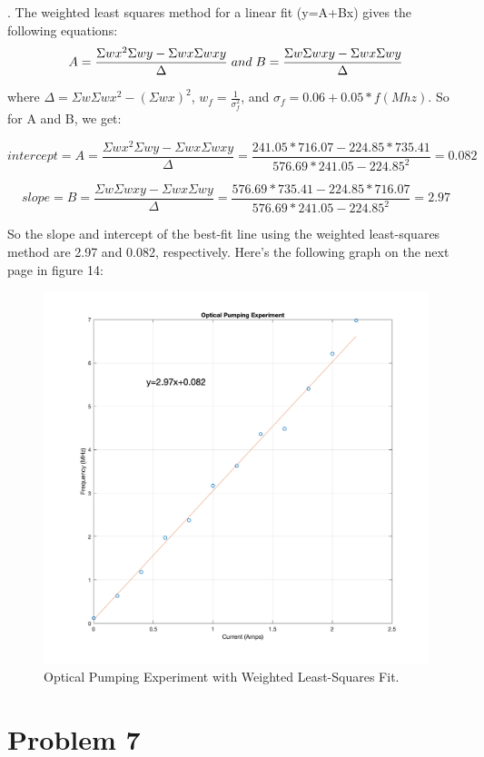 \documentclass{article}
\begin{document}
. The weighted least squares method for a linear fit (y=A+Bx) gives the following equations:
 \[ A=\frac{\Sigma wx^2\Sigma wy-\Sigma wx\Sigma wxy}{\Delta}\hspace{1mm}and\hspace{1mm}B=\frac{\Sigma w\Sigma wxy-\Sigma wx\Sigma wy}{\Delta} \]
 
 \noindent where $\Delta=\Sigma w\Sigma wx^2-(\Sigma wx)^2$, $w_f=\frac{1}{\sigma_f^2}$, and $\sigma_f=0.06+0.05*f(Mhz)$. So for A and B, we get:
 
 \[ intercept=A=\frac{\Sigma wx^2\Sigma wy-\Sigma wx\Sigma wxy}{\Delta}=\frac{241.05*716.07-224.85*735.41}{576.69*241.05-224.85^2 }=\boxed{0.082}\]

\[ slope=B=\frac{\Sigma w\Sigma wxy-\Sigma wx\Sigma wy}{\Delta}=\frac{576.69*735.41-224.85*716.07}{576.69*241.05-224.85^2}=\boxed{2.97}\]

So the slope and intercept of the best-fit line using the weighted least-squares method are 2.97 and 0.082, respectively. Here’s the following graph on the next page in figure 14:

\begin{figure}[H]
  \centering
  \includegraphics[width=0.8\linewidth]{lateximages/Prob6_4.png}
  \caption{Optical Pumping Experiment with Weighted Least-Squares Fit.}
  \label{fig:boat2}
  \end{figure}
  
  \section*{Problem 7} 
\end{document}
